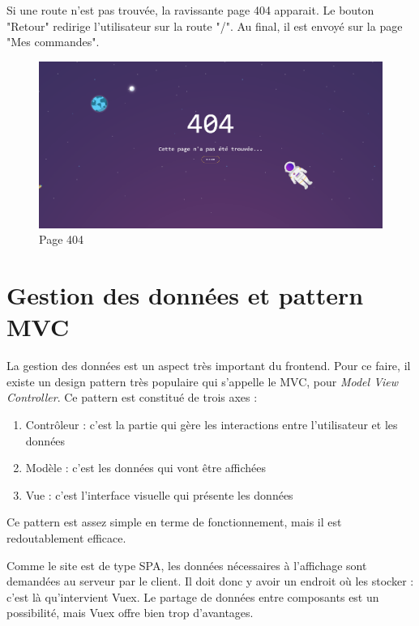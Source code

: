 \documentclass[
    iai, %
    eai, %
]{heig-tb}
\begin{document}
Si une route n'est pas trouvée, la ravissante page 404 apparait. Le bouton "Retour" redirige l'utilisateur sur la route "/". Au final, il est envoyé sur la page "Mes commandes".

\begin{figure}[h]
  \includegraphics[width=14cm]{ui_404.PNG}
  \caption{Page 404}
\end{figure}


\newpage
\section{Gestion des données et pattern MVC}
La gestion des données est un aspect très important du frontend.
Pour ce faire, il existe un design pattern très populaire qui s'appelle le MVC, pour \emph{Model View Controller}.
Ce pattern est constitué de trois axes :
\begin{enumerate}
  \item Contrôleur : c'est la partie qui gère les interactions entre l'utilisateur et les données
  \item Modèle : c'est les données qui vont être affichées
  \item Vue : c'est l'interface visuelle qui présente les données
\end{enumerate}
\bigskip

Ce pattern est assez simple en terme de fonctionnement, mais il est redoutablement efficace.


Comme le site est de type SPA, les données nécessaires à l'affichage sont demandées au serveur par le client.
Il doit donc y avoir un endroit où les stocker : c'est là qu'intervient Vuex.
Le partage de données entre composants est un possibilité, mais Vuex offre bien trop d'avantages.
\end{document}
